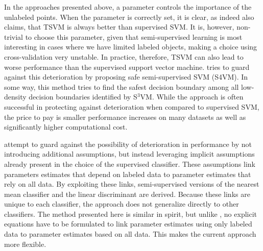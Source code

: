\documentclass{llncs}
\begin{document}
In the approaches presented above, a parameter controls the importance of the unlabeled points. When the parameter is correctly set, it is clear, as \cite{Wang2007a} indeed also claims, that TSVM is always better than supervised SVM. It is, however, non-trivial to choose this parameter, given that semi-supervised learning is most interesting in cases where we have limited labeled objects, making a choice using cross-validation very unstable. In practice, therefore, TSVM can also lead to worse performance than the supervised support vector machine. \cite{Li2011} tries to guard against this deterioration by proposing safe semi-supervised SVM (S4VM). In some way, this method tries to find the safest decision boundary among all low-density decision boundaries identified by S$^3$VM. While the approach is often successful in protecting against deterioration when compared to supervised SVM, the price to pay is smaller performance increases on many datasets as well as significantly higher computational cost.

\cite{Loog2014b,Loog2014a} attempt to guard against the possibility of deterioration in performance by not introducing additional assumptions, but instead leveraging implicit assumptions already present in the choice of the supervised classifier. These assumptions link parameters estimates that depend on labeled data to parameter estimates that rely on all data. By exploiting these links, semi-supervised versions of the nearest mean classifier and the linear discriminant are derived. Because these links are unique to each classifier, the approach does not generalize directly to other classifiers. The method presented here is similar in spirit, but unlike \cite{Loog2014b,Loog2014a}, no explicit equations have to be formulated to link parameter estimates using only labeled data to parameter estimates based on all data. This makes the current approach more flexible.
\end{document}
